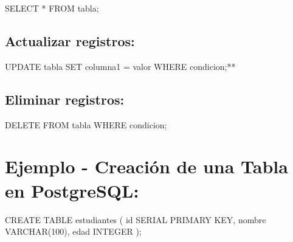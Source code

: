 \documentclass[
  a4paper,
  onepage,
  openany]{scrreprt}
\newenvironment{Shaded}{\begin{snugshade}}{\end{snugshade}}
\newcommand{\DataTypeTok}[1]{\textcolor[rgb]{0.68,0.00,0.00}{#1}}
\newcommand{\DecValTok}[1]{\textcolor[rgb]{0.68,0.00,0.00}{#1}}
\newcommand{\KeywordTok}[1]{\textcolor[rgb]{0.00,0.23,0.31}{#1}}
\newcommand{\NormalTok}[1]{\textcolor[rgb]{0.00,0.23,0.31}{#1}}
\newcommand{\OperatorTok}[1]{\textcolor[rgb]{0.37,0.37,0.37}{#1}}
\begin{document}
\begin{Shaded}
\begin{Highlighting}[]
\KeywordTok{SELECT} \OperatorTok{*} \KeywordTok{FROM}\NormalTok{ tabla;}
\end{Highlighting}
\end{Shaded}

\hypertarget{actualizar-registros-1}{%
\subsection{Actualizar registros:}\label{actualizar-registros-1}}

\begin{Shaded}
\begin{Highlighting}[]
\KeywordTok{UPDATE}\NormalTok{ tabla }\KeywordTok{SET}\NormalTok{ columna1 }\OperatorTok{=}\NormalTok{ valor }\KeywordTok{WHERE}\NormalTok{ condicion;}\OperatorTok{**}
\end{Highlighting}
\end{Shaded}

\hypertarget{eliminar-registros-1}{%
\subsection{Eliminar registros:}\label{eliminar-registros-1}}

\begin{Shaded}
\begin{Highlighting}[]
\KeywordTok{DELETE} \KeywordTok{FROM}\NormalTok{ tabla }\KeywordTok{WHERE}\NormalTok{ condicion;}
\end{Highlighting}
\end{Shaded}

\hypertarget{ejemplo---creaciuxf3n-de-una-tabla-en-postgresql-1}{%
\section{Ejemplo - Creación de una Tabla en
PostgreSQL:}\label{ejemplo---creaciuxf3n-de-una-tabla-en-postgresql-1}}

\begin{Shaded}
\begin{Highlighting}[]
\KeywordTok{CREATE} \KeywordTok{TABLE}\NormalTok{ estudiantes (}
    \KeywordTok{id}\NormalTok{ SERIAL }\KeywordTok{PRIMARY} \KeywordTok{KEY}\NormalTok{,}
\NormalTok{    nombre }\DataTypeTok{VARCHAR}\NormalTok{(}\DecValTok{100}\NormalTok{),}
\NormalTok{    edad }\DataTypeTok{INTEGER}
\NormalTok{);}
\end{Highlighting}
\end{Shaded}
\end{document}
